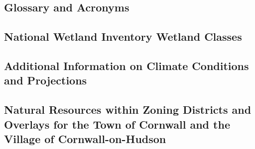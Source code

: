 \documentclass[11pt]{article}
\makeatletter
\def\namedlabel#1#2{\begingroup
   \def\@currentlabel{#2}%
   \label{#1}\endgroup
}
\makeatother
\begin{document}
\subsection{Glossary and Acronyms}\label{subsec:glossary}
\glsaddall
\renewcommand{\glossarysection}[2][]{}
\printglossary

\addtocounter{subsection}{1}

\namedlabel{app:cornwall_species}{Known Species of Conservation Concern in the Town of Cornwall and Village of Cornwall-on-Hudson, NY}

\addtocounter{subsection}{1}
\label{app:wetland_protection}

\subsection{National Wetland Inventory Wetland Classes}
\label{app:cornwall_wetlands}

\subsection{Additional Information on Climate Conditions and Projections}
\label{app:climate_projection}

\subsection{Natural Resources within Zoning Districts and Overlays for the Town 
of Cornwall and the Village of Cornwall-on-Hudson}
\label{app:zoning}

\addtocounter{subsection}{1}
\label{app:oc_resiliency}

\addtocounter{subsection}{1}
\label{app:water_quality}
\end{document}
